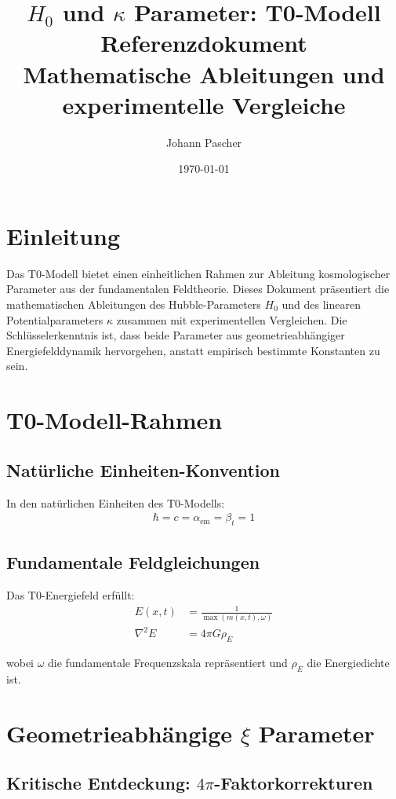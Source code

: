 \documentclass[12pt,a4paper]{article}
\title{$H_0$ und $\kappa$ Parameter: T0-Modell Referenzdokument\\
	\large Mathematische Ableitungen und experimentelle Vergleiche}
\author{Johann Pascher}
\date{\today}
\begin{document}
	
	\maketitle
	
	\section{Einleitung}
	
	Das T0-Modell bietet einen einheitlichen Rahmen zur Ableitung kosmologischer Parameter aus der fundamentalen Feldtheorie. Dieses Dokument präsentiert die mathematischen Ableitungen des Hubble-Parameters $H_0$ und des linearen Potentialparameters $\kappa$ zusammen mit experimentellen Vergleichen. Die Schlüsselerkenntnis ist, dass beide Parameter aus geometrieabhängiger Energiefelddynamik hervorgehen, anstatt empirisch bestimmte Konstanten zu sein.
	
	\section{T0-Modell-Rahmen}
	
	\subsection{Natürliche Einheiten-Konvention}
	In den natürlichen Einheiten des T0-Modells:
	\begin{align}
		\hbar = c = \alpha_{\text{em}} = \beta_t = 1
	\end{align}
	
	\subsection{Fundamentale Feldgleichungen}
	Das T0-Energiefeld erfüllt:
	\begin{align}
		E(x,t) &= \frac{1}{\max(m(x,t), \omega)} \\
		\nabla^2 E &= 4\pi G \rho_E
	\end{align}
	
	wobei $\omega$ die fundamentale Frequenzskala repräsentiert und $\rho_E$ die Energiedichte ist.
	
	\section{Geometrieabhängige $\xi$ Parameter}
	
	\subsection{Kritische Entdeckung: $4\pi$-Faktorkorrekturen}
	
\end{document}
